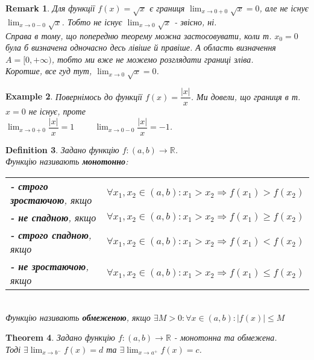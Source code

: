 \documentclass[a4paper, 14pt]{article}
\def\huge{\displaystyle}
\theoremstyle{theoremdd}
\newtheorem{theorem}{Theorem}[subsection]
\theoremstyle{theoremdd}
\newtheorem{definition}[theorem]{Definition}
\theoremstyle{theoremdd}
\theoremstyle{theoremdd}
\newtheorem{example}[theorem]{Example}
\theoremstyle{theoremdd}
\theoremstyle{theoremdd}
\newtheorem{remark}[theorem]{Remark}
\theoremstyle{theoremdd}
\theoremstyle{theoremdd}
\begin{document}
\begin{remark}
Для функції $f(x) = \sqrt{x}$ є границя $\huge\lim_{x \to 0+0} \sqrt{x} = 0$, але не існує $\huge\lim_{x \to 0-0} \sqrt{x}$. Тобто не існує $\huge\lim_{x \to 0} \sqrt{x}$ - звісно, ні.\\
Справа в тому, що попередню теорему можна застосовувати, коли т. $x_0 = 0$ була б визначена одночасно десь лівіше й правіше. А область визначення $A = [0,+\infty)$, тобто ми вже не можемо розглядати границі зліва.\\
Коротше, все гуд тут, $\huge\lim_{x \to 0} \sqrt{x} = 0$.
\end{remark}

\begin{example}
Повернімось до функції $f(x) = \dfrac{|x|}{x}$. Ми довели, що границя в т. $x=0$ не існує, проте\\
$\huge\lim_{x \to 0+0} \dfrac{|x|}{x} = 1 \hspace{1cm} \lim_{x \to 0-0} \dfrac{|x|}{x} = -1$.
\end{example}

\begin{definition}
Задано функцію $f: (a,b) \to \mathbb{R}$.\\
Функцію називають \textbf{монотонно}:\\
\begin{tabular}{ll}
\textbf{- строго зростаючою}, якщо & $\forall x_1,x_2 \in (a,b): x_1 > x_2 \Rightarrow f(x_1)>f(x_2)$\\
\textbf{- не спадною}, якщо & $\forall x_1,x_2 \in (a,b): x_1 > x_2 \Rightarrow f(x_1) \geq f(x_2)$\\
\textbf{- строго спадною}, якщо & $\forall x_1,x_2 \in (a,b): x_1 > x_2 \Rightarrow f(x_1) < f(x_2)$\\
\textbf{- не зростаючою}, якщо & $\forall x_1,x_2 \in (a,b): x_1 > x_2 \Rightarrow f(x_1) \leq f(x_2)$
\end{tabular}\\
Функцію називають \textbf{обмеженою}, якщо $\exists M>0: \forall x \in (a,b): |f(x)| \leq M$
\end{definition}

\begin{theorem}
Задано функцію $f: (a,b) \to \mathbb{R}$ - монотонна та обмежена.\\
Тоді $\huge \exists \lim_{x \to b^-} f(x) = d$ та $\huge \exists \lim_{x \to a^+} f(x) = c$.
\end{theorem}
\end{document}

